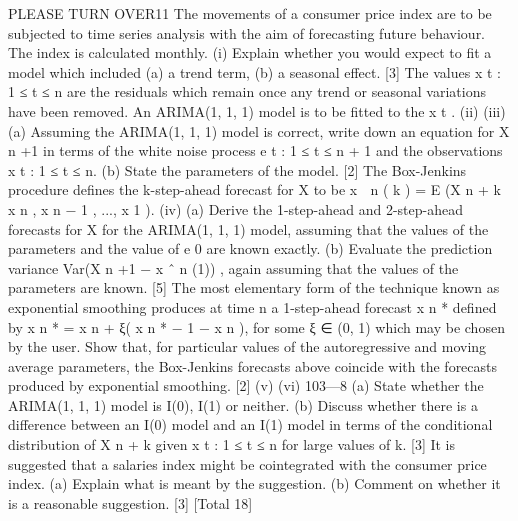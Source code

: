 \documentclass[a4paper,12pt]{article}
\begin{document}
\begin{enumerate}

PLEASE TURN OVER11
The movements of a consumer price index are to be subjected to time series
analysis with the aim of forecasting future behaviour. The index is calculated
monthly.
(i)
Explain whether you would expect to fit a model which included (a) a
trend term, (b) a seasonal effect.
[3]
The values {x t : 1 ≤ t ≤ n} are the residuals which remain once any trend or
seasonal variations have been removed. An ARIMA(1, 1, 1) model is to be fitted
to the {x t }.
(ii)
(iii)
(a) Assuming the ARIMA(1, 1, 1) model is correct, write down an
equation for X n +1 in terms of the white noise process
{e t : 1 ≤ t ≤ n + 1} and the observations {x t : 1 ≤ t ≤ n}.
(b) State the parameters of the model.
[2]
The Box-Jenkins procedure defines the k-step-ahead forecast for X to be
x  n ( k ) = E (X n + k  x n , x n − 1 , ..., x 1 ).
(iv)
(a) Derive the 1-step-ahead and 2-step-ahead forecasts for X for the
ARIMA(1, 1, 1) model, assuming that the values of the parameters
and the value of e 0 are known exactly.
(b) Evaluate the prediction variance Var(X n +1 − x ˆ n (1)) , again assuming
that the values of the parameters are known.
[5]
The most elementary form of the technique known as exponential
smoothing produces at time n a 1-step-ahead forecast x n * defined by
x n * = x n + ξ( x n * − 1 − x n ),
for some ξ ∈ (0, 1) which may be chosen by the user.
Show that, for particular values of the autoregressive and moving average
parameters, the Box-Jenkins forecasts above coincide with the forecasts
produced by exponential smoothing.
[2]
(v)
(vi)
103—8
(a) State whether the ARIMA(1, 1, 1) model is I(0), I(1) or neither.
(b) Discuss whether there is a difference between an I(0) model and an
I(1) model in terms of the conditional distribution of X n + k given {x t :
1 ≤ t ≤ n} for large values of k. [3]
It is suggested that a salaries index might be cointegrated with the
consumer price index.
(a) Explain what is meant by the suggestion.
(b) Comment on whether it is a reasonable suggestion.
[3]
[Total 18]





\end{enumerate}
\end{document}
